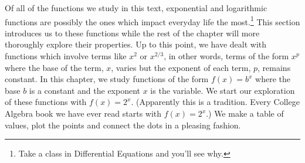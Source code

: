 

\setcounter{footnote}{0}

\label{IntroExpLogs}

Of all of the functions we study in this text, exponential and logarithmic functions are possibly the ones which impact everyday life the most.\footnote{Take a class in Differential Equations and you'll see why.} This section introduces us to these functions while the rest of the chapter will more thoroughly explore their properties.  Up to this point, we have dealt with functions which involve terms like $x^2$ or $x^{2/3}$, in other words, terms of the form  $x^{p}$ where the base of the term, $x$, varies but the exponent of each term, $p$, remains constant.  In this chapter, we study functions of the form $f(x) = b^{x}$ where the base $b$ is a constant and the exponent $x$ is the variable.  We start our exploration of these functions with $f(x) = 2^{x}$. (Apparently this is a tradition.  Every College Algebra book we have ever read starts with $f(x) = 2^{x}$.) We make a table of values, plot the points and connect the dots in a pleasing fashion.

